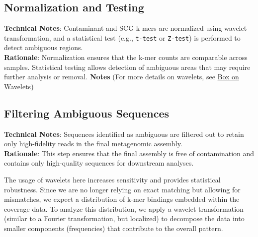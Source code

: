 \documentclass[11pt]{report}
\begin{document}
{\subsection{Normalization and Testing} \textbf{Technical Notes}: Contaminant and SCG k-mers are normalized using wavelet transformation, and a statistical test (e.g., \texttt{t-test} or \texttt{Z-test}) is performed to detect ambiguous regions.\\
\textbf{Rationale}: Normalization ensures that the k-mer counts are comparable across samples. Statistical testing allows detection of ambiguous areas that may require further analysis or removal. 
\textbf{Notes} (For more details on wavelets, see \hyperref[box:wavelets]{Box on Wavelets})

\subsection{Filtering Ambiguous Sequences} \textbf{Technical Notes}: Sequences identified as ambiguous are filtered out to retain only high-fidelity reads in the final metagenomic assembly. \\
\textbf{Rationale}: This step ensures that the final assembly is free of contamination and contains only high-quality sequences for downstream analyses. 


\begin{tcolorbox}[coltitle=white, title=Personal Notes]
	The usage of wavelets here increases sensitivity and provides statistical robustness. Since we are no longer relying on exact matching but allowing for mismatches, we expect a distribution of k-mer bindings embedded within the coverage data. To analyze this distribution, we apply a wavelet transformation (similar to a Fourier transformation, but localized) to decompose the data into smaller components (frequencies) that contribute to the overall pattern.
	

\end{tcolorbox}}
\end{document}

